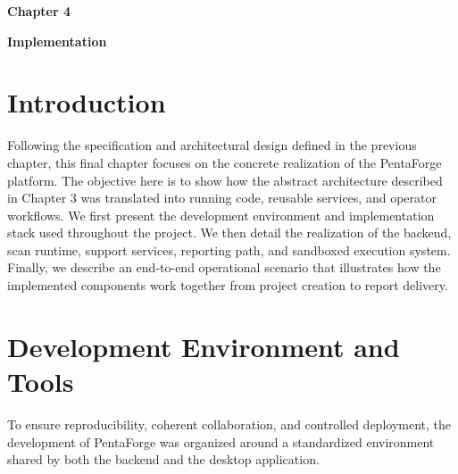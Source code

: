\documentclass[12pt,a4paper]{report}
\begin{document}
\pagestyle{fancy}
\newpage
\pagestyle{chapterfour}

\vspace*{4cm}

{\fontsize{26}{30}\selectfont \textbf{Chapter 4}}\par

\vspace{1cm}

{\LARGE\bfseries Implementation}

\vspace{0.8cm}

\setcounter{chapter}{4}
\setcounter{section}{0}

\section*{Introduction}

Following the specification and architectural design defined in the previous chapter,
this final chapter focuses on the concrete realization of the PentaForge platform.
The objective here is to show how the abstract architecture described in Chapter 3
was translated into running code, reusable services, and operator workflows. We
first present the development environment and implementation stack used throughout
the project. We then detail the realization of the backend, scan runtime, support
services, reporting path, and sandboxed execution system. Finally, we describe an
end-to-end operational scenario that illustrates how the implemented components work
together from project creation to report delivery.

\section{Development Environment and Tools}

To ensure reproducibility, coherent collaboration, and controlled deployment, the
development of PentaForge was organized around a standardized environment shared by
both the backend and the desktop application.
\end{document}
